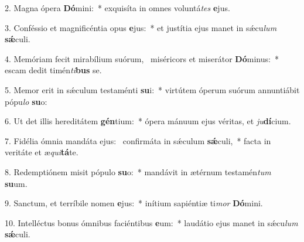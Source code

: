 2. Magna ópera \textbf{Dó}mini:~*  exquisíta in omnes voluntá\textit{tes} \textbf{e}jus.\

3. Conféssio et magnificéntia opus \textbf{e}jus:~*  et justítia ejus manet in sǽcu\textit{lum} \textbf{sǽ}culi.\

4. Memóriam fecit mirabílium suórum, \dag\  miséricors et miserátor \textbf{Dó}minus:~*  escam dedit timén\textit{ti}\textbf{bus} se.\

5. Memor erit in sǽculum testaménti \textbf{su}i:~*  virtútem óperum suórum annuntiábit pópu\textit{lo} \textbf{su}o:\

6. Ut det illis hereditátem \textbf{gén}tium:~*  ópera mánuum ejus véritas, et \textit{ju}\textbf{dí}cium.\

7. Fidélia ómnia mandáta ejus: \dag\  confirmáta in sǽculum \textbf{sǽ}culi,~*  facta in veritáte et æ\textit{qui}\textbf{tá}te.\

8. Redemptiónem misit pópulo \textbf{su}o:~*  mandávit in ætérnum testamén\textit{tum} \textbf{su}um.\

9. Sanctum, et terríbile nomen \textbf{e}jus:~*  inítium sapiéntiæ ti\textit{mor} \textbf{Dó}mini.\

10. Intelléctus bonus ómnibus faciéntibus \textbf{e}um:~*  laudátio ejus manet in sǽcu\textit{lum} \textbf{sǽ}culi.\

